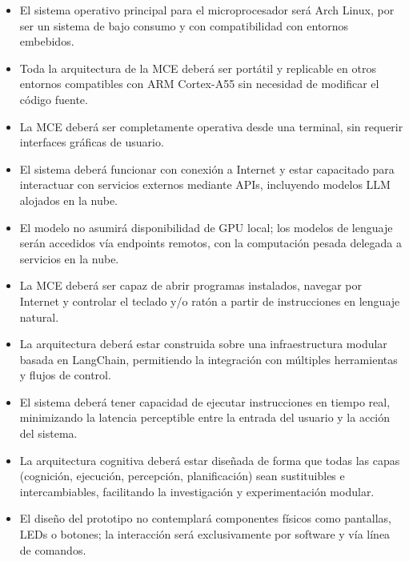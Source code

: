 \begin{itemize}

    \item El sistema operativo principal para el microprocesador será Arch
    Linux, por ser un sistema de bajo consumo y con compatibilidad con entornos embebidos.

    \item Toda la arquitectura de la MCE deberá ser portátil y replicable en
    otros entornos compatibles con ARM Cortex-A55 sin necesidad de modificar el
    código fuente.
    
    \item La MCE deberá ser completamente operativa desde una terminal, sin
    requerir interfaces gráficas de usuario.
    
    \item El sistema deberá funcionar con conexión a Internet y estar capacitado
    para interactuar con servicios externos mediante APIs, incluyendo modelos
    LLM alojados en la nube.
    
    \item El modelo no asumirá disponibilidad de GPU local; los modelos de
    lenguaje serán accedidos vía endpoints remotos, con la computación pesada
    delegada a servicios en la nube.
    
    \item La MCE deberá ser capaz de abrir programas instalados, 
    navegar por Internet y controlar el teclado y/o ratón a partir de
    instrucciones en lenguaje natural.
    
    \item La arquitectura deberá estar construida sobre una infraestructura
    modular basada en LangChain, permitiendo la integración con múltiples
    herramientas y flujos de control.
    
    \item El sistema deberá tener capacidad de ejecutar instrucciones en tiempo
    real, minimizando la latencia perceptible entre la entrada del usuario y la
    acción del sistema.
    
    \item La arquitectura cognitiva deberá estar diseñada de forma que todas las
    capas (cognición, ejecución, percepción, planificación) sean sustituibles e
    intercambiables, facilitando la investigación y experimentación modular.
    
    \item El diseño del prototipo no contemplará componentes físicos como
    pantallas, LEDs o botones; la interacción será exclusivamente por software y
    vía línea de comandos.

\end{itemize}

